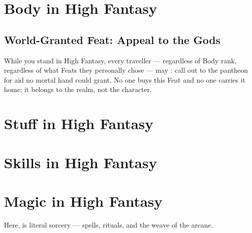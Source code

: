 \section{Body in High Fantasy}
\lipsum[29][1-4]

\subsection*{World-Granted Feat: Appeal to the Gods}
While you stand in High Fantasy, every traveller --- regardless of Body
rank, regardless of what Feats they personally chose --- may
: call out to the pantheon for aid no mortal
hand could grant. No one buys this Feat and no one carries it home; it
belongs to the realm, not the character. 

\section{Stuff in High Fantasy}
\lipsum[30][1-4]

\section{Skills in High Fantasy}
\lipsum[31][1-4]

\section{Magic in High Fantasy}
Here,  is literal sorcery --- spells, rituals, and the
weave of the arcane. \lipsum[32][1-3]

\begin{notebox}
\lipsum[33][1-3]
\end{notebox}
